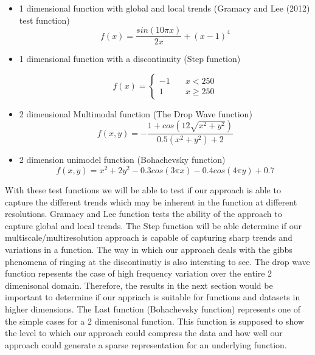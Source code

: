 \documentclass[procedia]{easychair}
\begin{document}
\begin{itemize}

\item 1 dimensional function with global and local trends (Gramacy and Lee (2012) test function)
\begin{equation}
f(x)  = \frac{sin(10 \pi x)}{2x} + {(x-1)}^4
\end{equation}
\item 1 dimensional function with a discontinuity (Step function)

\begin{equation}
f(x) = \left\{
        \begin{array}{ll}
            -1 & \quad x < 250 \\
            1 & \quad x \geq 250
        \end{array}
    \right.
\end{equation}


\item 2 dimensional Multimodal function (The Drop Wave function)
\begin{equation}
f(x,y) = - \frac{1 + cos(12 \sqrt{x^2 + y^2})}{0.5 (x^2 + y^2)+ 2}
\end{equation}
\item 2 dimension unimodel function (Bohachevsky function)
\begin{equation}
f(x,y) = x^2 + 2y^2 - 0.3cos(3 \pi x) - 0.4cos(4 \pi y) + 0.7
\end{equation}


\end{itemize}

With these test functions we will be able to test if our approach is able to capture the different trends which may be inherent in the function at different resolutions. Gramacy and Lee function tests the ability of the approach to capture global and local trends. The Step function will be able determine if our multiscale/multiresolution approach is capable of capturing sharp trends and variations in a function. The way in which our approach deals with the gibbs phenomena of ringing at the discontinutiy is also intersting to see. The drop wave function repesents the case of high frequency variation over the entire 2 dimenisonal domain. Therefore, the results in the next section would be important to determine if our appriach is suitable for functions and datasets in higher dimensions. The Last function (Bohachevsky function) represents one of the simple cases for a 2 dimenisonal function. This function is supposed to show the level to which our approach could compress the data and how well our approach could generate a sparse representation for an underlying function. 
\end{document}
